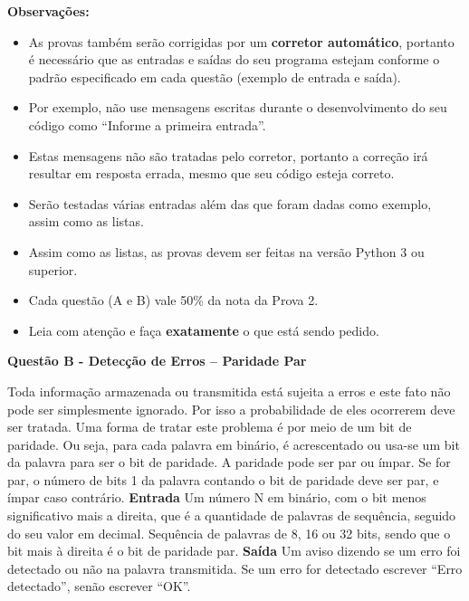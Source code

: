 \documentclass[a4paper, 12pt]{article}
\begin{document}
\textbf{{\large Observações:}}
\begin{itemize}
	\item As provas também serão corrigidas por um \textbf{corretor automático}, portanto é necessário que as entradas e saídas do seu programa estejam conforme o padrão especificado em cada questão (exemplo de entrada e saída). \item Por exemplo, não use mensagens escritas durante o desenvolvimento do seu código como “Informe a primeira entrada”.
	\item Estas mensagens não são tratadas pelo corretor, portanto a correção irá resultar em resposta errada, mesmo que seu código esteja correto.
	\item Serão testadas várias entradas além das que foram dadas como exemplo, assim como as listas.
	\item Assim como as listas, as provas devem ser feitas na versão Python 3 ou superior.
	\item Cada questão (A e B) vale 50\% da nota da Prova 2.
	\item Leia com atenção e faça \textbf{exatamente} o que está sendo pedido.
\end{itemize}
\newpage %
\begin{center}
\textbf{{\Large Questão B - Detecção de Erros – Paridade Par}}
\end{center}
\vspace{5pt}
Toda informação armazenada ou transmitida está sujeita a erros e este fato não pode ser
simplesmente ignorado. Por isso a probabilidade de eles ocorrerem deve ser tratada. Uma forma
de tratar este problema é por meio de um bit de paridade. Ou seja, para cada palavra em binário,
é acrescentado ou usa-se um bit da palavra para ser o bit de paridade. A paridade pode ser par
ou ímpar. Se for par, o número de bits 1 da palavra contando o bit de paridade deve ser par, e
ímpar caso contrário.
\newline \newline
\textbf{{\large Entrada}} \newline
Um número N em binário, com o bit menos significativo mais a direita, que é a quantidade de
palavras de sequência, seguido do seu valor em decimal. 
\newline Sequência de palavras de 8, 16 ou 32 bits, sendo que o bit mais à direita é o bit de paridade par.
\newline \newline
\textbf{{\large Saída}} \newline
Um aviso dizendo se um erro foi detectado ou não na palavra transmitida. Se um erro for
detectado escrever “Erro detectado”, senão escrever “OK”.
\newline \newline
\end{document}
